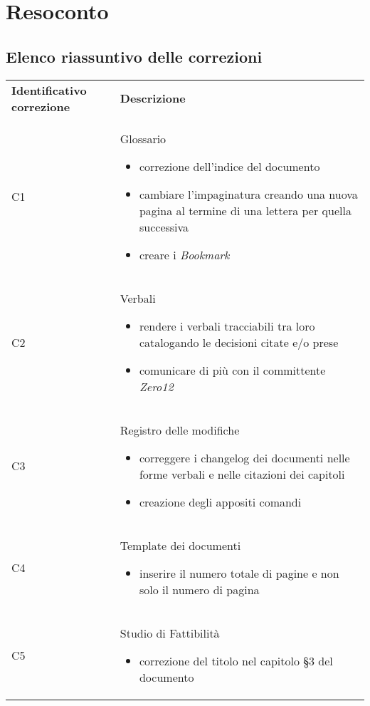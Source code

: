 \clearpage
\section{Resoconto}
	\subsection{Elenco riassuntivo delle correzioni}
	
	
		\begin{center}
			\renewcommand{\arraystretch}{1.5}
			\begin{longtable}{  p{3cm} p{11.2cm}  }
				\rowcolor{tableHeadYellow}
				\textbf{Identificativo correzione} & \textbf{Descrizione}\\
				C1 & 	 	Glossario
								\begin{itemize}
									\item correzione dell'indice del documento
									\item cambiare l'impaginatura creando una nuova pagina al termine di una lettera per quella successiva
									\item creare i \textit{Bookmark}
								\end{itemize}
				\\		
				C2 & 		Verbali
								\begin{itemize}
									\item rendere i verbali tracciabili tra loro catalogando le decisioni citate e/o prese 
									\item comunicare di più con il committente \textit{Zero12}
								\end{itemize}
				\\
				C3 & 		Registro delle modifiche
								\begin{itemize}
									\item correggere i changelog dei documenti nelle forme verbali e nelle citazioni dei capitoli
									\item creazione degli appositi comandi
								\end{itemize}
				\\
				C4 & 		Template dei documenti
								\begin{itemize}
									\item inserire il numero totale di pagine e non solo il numero di pagina
								\end{itemize}
				
				\\
				C5 & 		Studio di Fattibilità
								\begin{itemize}
									\item correzione del titolo nel capitolo §3 del documento
								\end{itemize}
				

\end{longtable}
\end{center}
